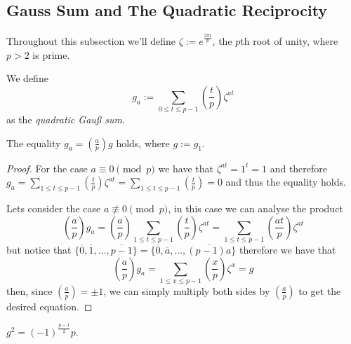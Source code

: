 \subsection{Gauss Sum and The Quadratic Reciprocity}

Throughout this subsection we'll define \(\zeta := e^{\frac{2\pi i}{p}}\), the
\(p\)th root of unity, where \(p > 2\) is prime.

\begin{definition}
   We define \[g_a := \sum_{0 \leqslant t \leqslant p-1} \left( \frac{t}{p}
   \right) \zeta^{at}\] as the \emph{quadratic Gau{\ss} sum}.
\end{definition}

\begin{proposition}
   The equality \(g_a = \left( \frac{a}{p} \right) g\) holds, where \(g:=g_1\).
\end{proposition}

\begin{proof}
   For the case \(a \equiv 0 \pmod{p}\) we have that \(\zeta^{at} = 1^t = 1\)
   and therefore \(g_a = \sum_{1 \leqslant t \leqslant p-1} \left( \frac{t}{p}
   \right) \zeta^{at} = \sum_{1 \leqslant t \leqslant p-1} \left( \frac{t}{p}
   \right) = 0\) and thus the equality holds.

   Lets consider the case \(a \not\equiv 0 \pmod{p}\), in this case we can
   analyse the product
    \[
       \left( \frac{a}{p} \right) g_a = \left( \frac{a}{p} \right) \sum_{1
       \leqslant t \leqslant p-1} \left( \frac{t}{p} \right) \zeta^{at} =
       \sum_{1 \leqslant t \leqslant p-1} \left( \frac{at}{p} \right) \zeta^{at}
   \] 
   but notice that \(\{\overline{0}, \overline{1}, \dots, \overline{p-1}\} =
   \{\overline{0}, \overline{a}, \dots, \overline{(p-1)a}\}\) therefore we have
   that
   \[
      \left( \frac{a}{p} \right) g_a = \sum_{1 \leqslant x \leqslant p-1} \left(
      \frac{x}{p}\right) \zeta^x = g
   \] 
   then, since \(\left( \frac{a}{p} \right) = \pm 1\), we can simply multiply
   both sides by \(\left( \frac{a}{p} \right)\) to get the desired equation.
\end{proof}

\begin{proposition}
   \(g^2 = (-1)^{\frac{p-1}{2}} p\).
\end{proposition}

